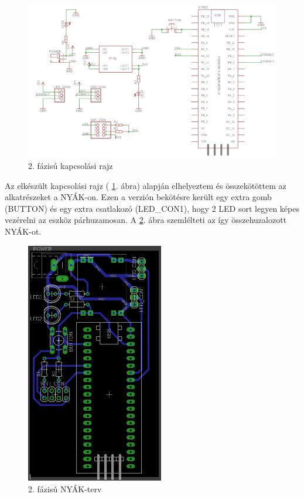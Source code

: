 \documentclass[../main.tex]{subfiles}
\begin{document}
        \begin{figure}[h!]
            \centering
                \includegraphics[width=15cm]{resources/pcb_res/schematic_v01.png}
            \caption{2. fázisú kapcsolási rajz}
            \label{fig:schematic_v01}
        \end{figure}
        
        Az elkészült kapcsolási rajz ( \ref{fig:schematic_v01}. ábra) alapján elhelyeztem és összekötöttem az alkatrészeket a NYÁK-on. Ezen a verzión bekötésre került egy extra gomb (BUTTON) és egy extra csatlakozó (LED\_CON1), hogy 2 LED sort legyen képes vezérelni az eszköz párhuzamosan. A \ref{fig:board_v01}. ábra szemlélteti az így összehuzalozott NYÁK-ot.
        
        \begin{figure}[h!]
            \centering
                \includegraphics[width=6cm, angle =-90]{resources/pcb_res/board_v01.png}
            \caption{2. fázisú NYÁK-terv}
            \label{fig:board_v01}
        \end{figure}
        
\end{document}
